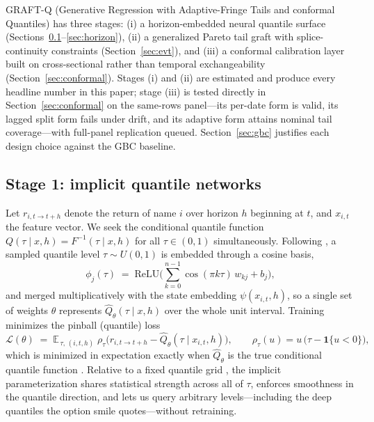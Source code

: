 \documentclass[11pt]{article}
\begin{document}
GRAFT-Q (Generative Regression with Adaptive-Fringe Tails and conformal Quantiles) has three stages: (i) a horizon-embedded neural quantile surface (Sections~\ref{sec:iqn}--\ref{sec:horizon}), (ii) a generalized Pareto tail graft with splice-continuity constraints (Section~\ref{sec:evt}), and (iii) a conformal calibration layer built on cross-sectional rather than temporal exchangeability (Section~\ref{sec:conformal}). Stages (i) and (ii) are estimated and produce every headline number in this paper; stage (iii) is tested directly in Section~\ref{sec:conformal} on the same-rows panel---its per-date form is valid, its lagged split form fails under drift, and its adaptive form attains nominal tail coverage---with full-panel replication queued. Section~\ref{sec:gbc} justifies each design choice against the GBC baseline.

\subsection{Stage 1: implicit quantile networks}\label{sec:iqn}
Let $r_{i,t\rightarrow t+h}$ denote the return of name $i$ over horizon $h$ beginning at $t$, and $x_{i,t}$ the feature vector. We seek the conditional quantile function $Q(\tau \mid x, h) = F^{-1}(\tau \mid x, h)$ for all $\tau \in (0,1)$ simultaneously. Following \citet{dabney2018iqn}, a sampled quantile level $\tau \sim U(0,1)$ is embedded through a cosine basis,
\begin{equation}
\phi_j(\tau) \;=\; \mathrm{ReLU}\!\Big(\textstyle\sum_{k=0}^{n-1} \cos(\pi k \tau)\, w_{kj} + b_j\Big),
\end{equation}
and merged multiplicatively with the state embedding $\psi(x_{i,t}, h)$, so a single set of weights $\theta$ represents $\hat{Q}_\theta(\tau \mid x, h)$ over the whole unit interval. Training minimizes the pinball (quantile) loss
\begin{equation}
\mathcal{L}(\theta) \;=\; \mathbb{E}_{\,\tau,\, (i,t,h)}\;\rho_\tau\!\big(r_{i,t\rightarrow t+h} - \hat{Q}_\theta(\tau \mid x_{i,t}, h)\big),
\qquad
\rho_\tau(u) = u\,\big(\tau - \mathbf{1}\{u<0\}\big),
\end{equation}
which is minimized in expectation exactly when $\hat{Q}_\theta$ is the true conditional quantile function \citep{koenker1978, gneitingraftery2007}. Relative to a fixed quantile grid \citep{dabney2018qrdqn}, the implicit parameterization shares statistical strength across all of $\tau$, enforces smoothness in the quantile direction, and lets us query arbitrary levels---including the deep quantiles the option smile quotes---without retraining.
\end{document}
